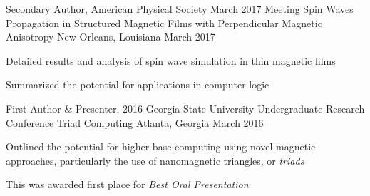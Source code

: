 \begin{cventries}
\cventry
{Secondary Author, American Physical Society March 2017 Meeting} %
{Spin Waves Propagation in Structured Magnetic Films with Perpendicular Magnetic Anisotropy} %
{New Orleans, Louisiana} %
{March 2017} %
{ %
\begin{cvitems}
\item {Detailed results and analysis of spin wave simulation in thin magnetic films}
\item {Summarized the potential for applications in computer logic}
\end{cvitems}
}


\cventry
{First Author \& Presenter, 2016 Georgia State University Undergraduate Research Conference} %
{Triad Computing} %
{Atlanta, Georgia} %
{March 2016} %
{ %
\begin{cvitems}
\item {Outlined the potential for higher-base computing using novel magnetic approaches, particularly the use of nanomagnetic triangles, or \em{triads}}
\item {This was awarded first place for \em{Best Oral Presentation}}
\end{cvitems}
}


\end{cventries}
